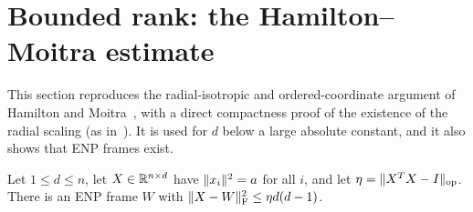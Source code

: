 \section{Bounded rank: the Hamilton--Moitra estimate}\label{sec:bounded}

This section reproduces the radial-isotropic and ordered-coordinate argument of
Hamilton and Moitra~\cite{HM}, with a direct compactness proof of the existence
of the radial scaling (as in~\cite{Orig}). It is used for $d$ below a large
absolute constant, and it also shows that ENP frames exist.

\begin{lemma}\label{lem:HM}
Let $1\le d\le n$, let $X\in\mathbb R^{n\times d}$ have $\lVert x_i\rVert^2=a$ for all $i$,
and let $\eta=\lVert X^TX-I\rVert_{\mathrm{op}}$. There is an ENP frame $W$ with
$\lVert X-W\rVert_{\mathrm F}^2\le\eta d(d-1)$.
\end{lemma}

